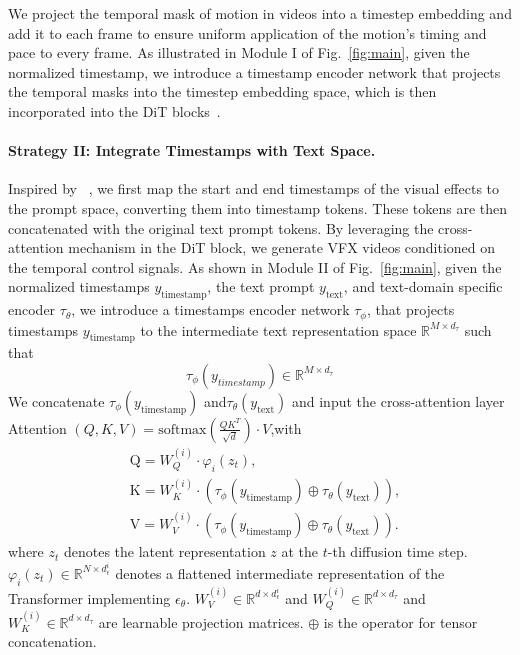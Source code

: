 We project the temporal mask of motion in videos into a timestep embedding and add it to each frame to ensure uniform application of the motion's timing and pace to every frame. 
As illustrated in Module I of Fig.~\ref{fig:main}, given the normalized timestamp, we introduce a timestamp encoder network that projects the temporal masks into the timestep embedding space, which is then incorporated into the DiT blocks~\cite{peebles2023scalable}.
\paragraph{\textbf{Strategy II: Integrate Timestamps with Text Space.}}
Inspired by ~\cite{fang2024camera}, we first map the start and end timestamps of the visual effects to the prompt space, converting them into timestamp tokens. These tokens are then concatenated with the original text prompt tokens. By leveraging the cross-attention mechanism in the DiT block, we generate VFX videos conditioned on the temporal control signals. As shown in Module II of Fig.~\ref{fig:main}, given the normalized timestamps $y_{\mathrm{timestamp}}$, the text prompt $y_{\mathrm{text}}$, and text-domain specific encoder $\tau_{\theta}$, we introduce a timestamps encoder network $\tau_{\phi}$, that projects timestamps $y_{\mathrm{timestamp}}$ to the intermediate text representation space $\mathbb{R}^{M\times d_{\tau}}$ such that
\begin{equation}
    \tau_\phi(y_{timestamp})\in\mathbb{R}^{M\times d_\tau}
\end{equation}
We concatenate $\tau_{\phi}(y_{\mathrm{timestamp}})$ and$\tau_\theta(y_{\mathrm{text}})$ and input the cross-attention layer Attention $(Q,K,V)={\mathrm{softmax}}\left({\frac{QK^{T}}{\sqrt{d}}}\right)\cdot V$,with
\begin{equation}
    \begin{aligned}&\mathrm{Q}=W_{Q}^{(i)}\cdot\varphi_{i}(z_{t}),\\&\mathrm{K}=W_{K}^{(i)}\cdot(\tau_{\phi}(y_{\mathrm{timestamp}})\oplus\tau_{\theta}(y_{\mathrm{text}})),\\&\mathrm{V}=W_{V}^{(i)}\cdot(\tau_{\phi}(y_{\mathrm{timestamp}})\oplus\tau_{\theta}(y_{\mathrm{text}})).\end{aligned}
\end{equation}
where $z_{t}$ denotes the latent representation  $z$ at the  $t$-th diffusion time step. $\varphi_{i}(z_{t})\in\mathbb{R}^{N\times d_{\epsilon}^{i}}$ denotes a flattened intermediate representation of the Transformer implementing $\epsilon_{\theta}$. $W_{V}^{(i)}\in\mathbb{R}^{d\times d_{\epsilon}^{i}}$ and $W_{Q}^{(i)}\in\mathbb{R}^{d\times d_{\tau}}$ and $W_K^{(i)}\in\mathbb{R}^{d\times d_\tau}$ are learnable projection matrices. $\oplus$ is the operator for tensor concatenation.

